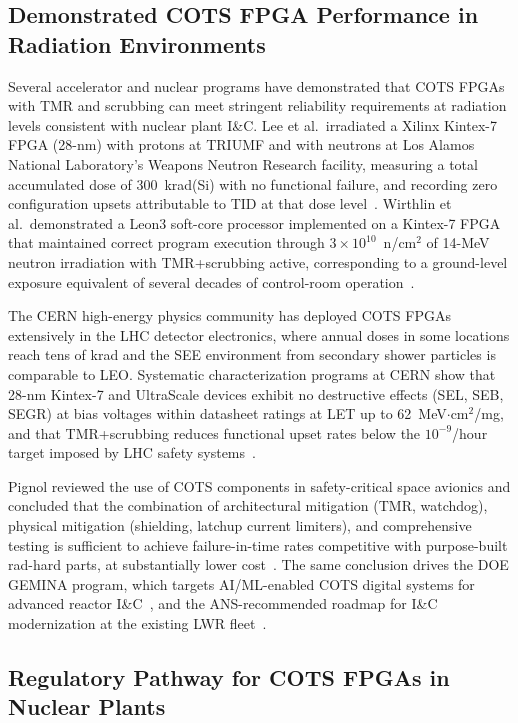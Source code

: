 \subsection{Demonstrated COTS FPGA Performance in Radiation Environments}

Several accelerator and nuclear programs have demonstrated that
COTS FPGAs with TMR and scrubbing can meet stringent reliability
requirements at radiation levels consistent with nuclear plant
I\&C.  Lee et al.\ irradiated a Xilinx Kintex-7 FPGA (28-nm)
with protons at TRIUMF and with neutrons at Los Alamos National
Laboratory's Weapons Neutron Research facility, measuring a total
accumulated dose of 300~krad(Si) with no functional failure,
and recording zero configuration upsets attributable to TID
at that dose level~\cite{lee2014kintex}.  Wirthlin et al.\
demonstrated a Leon3 soft-core processor implemented on a
Kintex-7 FPGA that maintained correct program execution through
$3 \times 10^{10}$~n/cm$^2$ of 14-MeV neutron irradiation
with TMR+scrubbing active, corresponding to a ground-level
exposure equivalent of several decades of control-room
operation~\cite{wirthlin2016leon3}.

The CERN high-energy physics community has deployed COTS FPGAs
extensively in the LHC detector electronics, where annual doses
in some locations reach tens of krad and the SEE environment
from secondary shower particles is comparable to LEO.
Systematic characterization programs at CERN show that 28-nm
Kintex-7 and UltraScale devices exhibit no destructive effects
(SEL, SEB, SEGR) at bias voltages within datasheet ratings at
LET up to 62~MeV$\cdot$cm$^2$/mg, and that TMR+scrubbing
reduces functional upset rates below the $10^{-9}$/hour target
imposed by LHC safety systems~\cite{CERN_FPGA_Rad}.

Pignol reviewed the use of COTS components in safety-critical
space avionics and concluded that the combination of
architectural mitigation (TMR, watchdog), physical mitigation
(shielding, latchup current limiters), and comprehensive testing
is sufficient to achieve failure-in-time rates competitive with
purpose-built rad-hard parts, at substantially lower
cost~\cite{pignol2010cots}.  The same conclusion drives the
DOE GEMINA program, which targets AI/ML-enabled COTS digital
systems for advanced reactor I\&C~\cite{DOE_GEMINA}, and the
ANS-recommended roadmap for I\&C modernization at the existing
LWR fleet~\cite{ANS_ICModernization_2025}.

\subsection{Regulatory Pathway for COTS FPGAs in Nuclear Plants}

